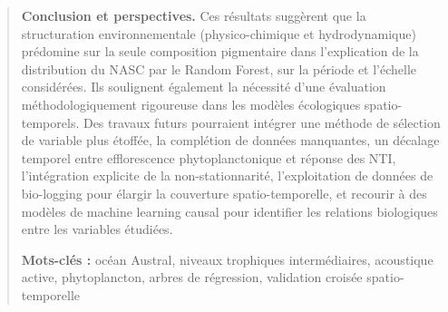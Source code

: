 \begin{abstract}
	
	\vspace{0.3cm}
	
	\textbf{Conclusion et perspectives.} Ces résultats suggèrent que la structuration environnementale (physico-chimique et hydrodynamique) prédomine sur la seule composition pigmentaire dans l'explication de la distribution du NASC par le Random Forest, sur la période et l'échelle considérées. Ils soulignent également la nécessité d'une évaluation méthodologiquement rigoureuse dans les modèles écologiques spatio-temporels. Des travaux futurs pourraient intégrer une méthode de sélection de variable plus étoffée, la complétion de données manquantes, un décalage temporel entre efflorescence phytoplanctonique et réponse des NTI, l'intégration explicite de la non-stationnarité, l'exploitation de données de bio-logging pour élargir la couverture spatio-temporelle, et recourir à des modèles de machine learning causal pour identifier les relations biologiques entre les variables étudiées.
	
	\vspace{0.5cm}
	\noindent\textbf{Mots-clés :} océan Austral, niveaux trophiques intermédiaires, acoustique active, phytoplancton, arbres de régression, validation croisée spatio-temporelle
\end{abstract}